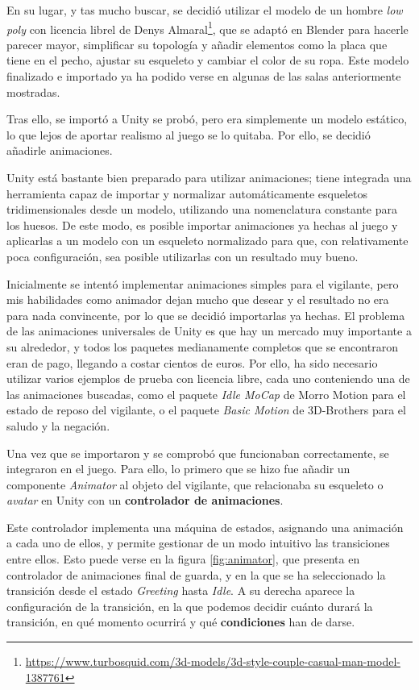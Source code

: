 En su lugar, y tas mucho buscar, se decidió utilizar el modelo de un hombre \textit{low poly} con licencia librel de Denys Almaral\footnote{\url{https://www.turbosquid.com/3d-models/3d-style-couple-casual-man-model-1387761}}, que se adaptó en Blender para hacerle parecer mayor, simplificar su topología y añadir elementos como la placa que tiene en el pecho, ajustar su esqueleto y cambiar el color de su ropa. Este modelo finalizado e importado ya ha podido verse en algunas de las salas anteriormente mostradas.

Tras ello, se importó a Unity se probó, pero era simplemente un modelo estático, lo que lejos de aportar realismo al juego se lo quitaba. Por ello, se decidió añadirle animaciones.

Unity está bastante bien preparado para utilizar animaciones; tiene integrada una herramienta capaz de importar y normalizar automáticamente esqueletos tridimensionales desde un modelo, utilizando una nomenclatura constante para los huesos. De este modo, es posible importar animaciones ya hechas al juego y aplicarlas a un modelo con un esqueleto normalizado para que, con relativamente poca configuración, sea posible utilizarlas con un resultado muy bueno.

Inicialmente se intentó implementar animaciones simples para el vigilante, pero mis habilidades como animador dejan mucho que desear y el resultado no era para nada convincente, por lo que se decidió importarlas ya hechas. El problema de las animaciones universales de Unity es que hay un mercado muy importante a su alrededor, y todos los paquetes medianamente completos que se encontraron eran de pago, llegando a costar cientos de euros. Por ello, ha sido necesario utilizar varios ejemplos de prueba con licencia libre, cada uno conteniendo una de las animaciones buscadas, como el paquete \textit{Idle MoCap} de Morro Motion para el estado de reposo del vigilante, o el paquete \textit{Basic Motion} de 3D-Brothers para el saludo y la negación.

Una vez que se importaron y se comprobó que funcionaban correctamente, se integraron en el juego. Para ello, lo primero que se hizo fue añadir un componente \textit{Animator} al objeto del vigilante, que relacionaba su esqueleto o \textit{avatar} en Unity con un \textbf{controlador de animaciones}.

Este controlador implementa una máquina de estados, asignando una animación a cada uno de ellos, y permite gestionar de un modo intuitivo las transiciones entre ellos. Esto puede verse en la figura \ref{fig:animator}, que presenta en controlador de animaciones final de guarda, y en la que se ha seleccionado la transición desde el estado \textit{Greeting} hasta \textit{Idle}. A su derecha aparece la configuración de la transición, en la que podemos decidir cuánto durará la transición, en qué momento ocurrirá y qué \textbf{condiciones} han de darse.

